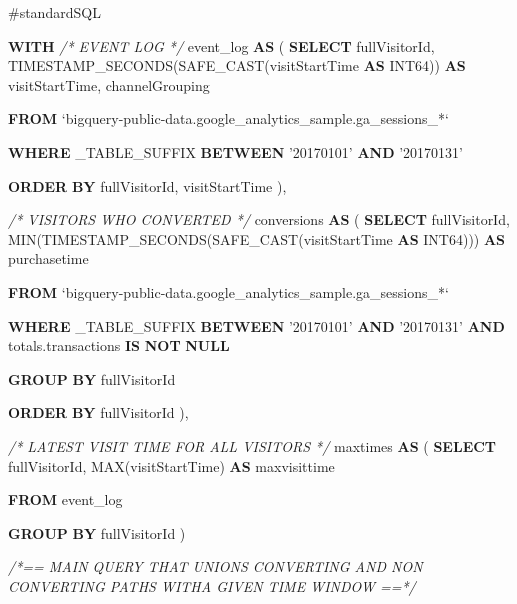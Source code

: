 \documentclass[]{book}
\newenvironment{Shaded}{\begin{snugshade}}{\end{snugshade}}
\newcommand{\CommentTok}[1]{\textcolor[rgb]{0.56,0.35,0.01}{\textit{#1}}}
\newcommand{\FunctionTok}[1]{\textcolor[rgb]{0.00,0.00,0.00}{#1}}
\newcommand{\KeywordTok}[1]{\textcolor[rgb]{0.13,0.29,0.53}{\textbf{#1}}}
\newcommand{\NormalTok}[1]{#1}
\newcommand{\StringTok}[1]{\textcolor[rgb]{0.31,0.60,0.02}{#1}}
\begin{document}
\begin{Shaded}
\begin{Highlighting}[]
\NormalTok{#standardSQL}

\KeywordTok{WITH} 
  \CommentTok{/* EVENT LOG */}
\NormalTok{  event_log }\KeywordTok{AS}\NormalTok{ (}
    \KeywordTok{SELECT}\NormalTok{ fullVisitorId, }
\NormalTok{          TIMESTAMP_SECONDS(SAFE_CAST(visitStartTime }\KeywordTok{AS}\NormalTok{ INT64))  }\KeywordTok{AS}\NormalTok{ visitStartTime,  }
\NormalTok{          channelGrouping}

    \KeywordTok{FROM}\NormalTok{ `bigquery-public-data.google_analytics_sample.ga_sessions_*`}

    \KeywordTok{WHERE}\NormalTok{ _TABLE_SUFFIX }\KeywordTok{BETWEEN} \StringTok{'20170101'} \KeywordTok{AND} \StringTok{'20170131'}

    \KeywordTok{ORDER} \KeywordTok{BY}\NormalTok{ fullVisitorId, visitStartTime}
\NormalTok{  ),}

 \CommentTok{/* VISITORS WHO CONVERTED */}
\NormalTok{ conversions }\KeywordTok{AS}\NormalTok{ (}
    \KeywordTok{SELECT}\NormalTok{ fullVisitorId, }
           \FunctionTok{MIN}\NormalTok{(TIMESTAMP_SECONDS(SAFE_CAST(visitStartTime }\KeywordTok{AS}\NormalTok{ INT64)))  }\KeywordTok{AS}\NormalTok{ purchasetime}

    \KeywordTok{FROM}\NormalTok{ `bigquery-public-data.google_analytics_sample.ga_sessions_*`}

    \KeywordTok{WHERE}\NormalTok{ _TABLE_SUFFIX }\KeywordTok{BETWEEN} \StringTok{'20170101'} \KeywordTok{AND} \StringTok{'20170131'}
     \KeywordTok{AND}\NormalTok{ totals.transactions }\KeywordTok{IS} \KeywordTok{NOT} \KeywordTok{NULL}

    \KeywordTok{GROUP} \KeywordTok{BY}\NormalTok{ fullVisitorId}

    \KeywordTok{ORDER} \KeywordTok{BY}\NormalTok{ fullVisitorId}
\NormalTok{  ),}
  
  \CommentTok{/* LATEST VISIT TIME FOR ALL VISITORS */}
\NormalTok{   maxtimes }\KeywordTok{AS}\NormalTok{ (}
    \KeywordTok{SELECT}\NormalTok{ fullVisitorId, }
    \FunctionTok{MAX}\NormalTok{(visitStartTime) }\KeywordTok{AS}\NormalTok{ maxvisittime}
    
    \KeywordTok{FROM}\NormalTok{ event_log}
    
    \KeywordTok{GROUP} \KeywordTok{BY}\NormalTok{ fullVisitorId}
\NormalTok{  )}

  \CommentTok{/*== MAIN QUERY THAT UNIONS CONVERTING AND NON CONVERTING PATHS WITHA GIVEN TIME WINDOW ==*/}
  

\end{Highlighting}
\end{Shaded}
\end{document}
